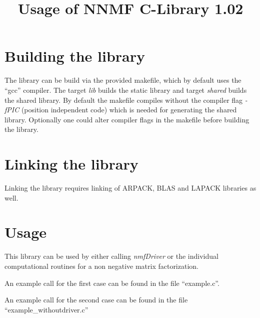\documentclass[a4paper,10pt]{scrartcl}
\title{Usage of NNMF C-Library 1.02}
\begin{document}
\fancyhead{}


\maketitle


	\section{Building the library}

	The library can be build via the provided makefile, which by default uses the ``gcc'' compiler.\newline\newline
	The target \emph{lib} builds the static library and target \emph{shared} builds the shared library.
	By default the makefile compiles without the compiler flag \emph{-fPIC} (position independent code) which is
	needed for generating the shared library.\newline\newline
	Optionally one could alter compiler flags in the makefile before building the library.

	\section{Linking the library}

	Linking the library requires linking of ARPACK, BLAS and LAPACK libraries as well.

	\section{Usage}

	This library can be used by either calling \emph{nmfDriver} or the individual computational routines for
	a non negative matrix factorization.\newline

	An example call for the first case can be found in the file ``example.c''.\newline

	An example call for the second case can be found in the file ``example\_withoutdriver.c''\newline

	

	
\end{document}
